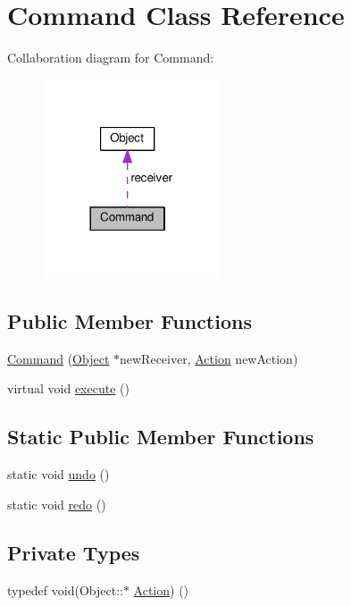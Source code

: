 \hypertarget{classCommand}{}\section{Command Class Reference}
\label{classCommand}


Collaboration diagram for Command\+:
\nopagebreak
\begin{figure}[H]
\begin{center}
\leavevmode
\includegraphics[width=149pt]{classCommand__coll__graph}
\end{center}
\end{figure}
\subsection*{Public Member Functions}
\begin{DoxyCompactItemize}
\item 
\hyperlink{classCommand_ab5004b23122fa06ca3613ee5d082ddc1}{Command} (\hyperlink{classObject}{Object} $\ast$new\+Receiver, \hyperlink{classCommand_a929c81cf8ef71dc52ef78156492f2a42}{Action} new\+Action)
\item 
virtual void \hyperlink{classCommand_a1f73a16e8706aec4c4db746f710b88d9}{execute} ()
\end{DoxyCompactItemize}
\subsection*{Static Public Member Functions}
\begin{DoxyCompactItemize}
\item 
static void \hyperlink{classCommand_a31a6d34a1d61f7cd994075a852714d3c}{undo} ()
\item 
static void \hyperlink{classCommand_ac807fae3326e22c02edc737708f9b288}{redo} ()
\end{DoxyCompactItemize}
\subsection*{Private Types}
\begin{DoxyCompactItemize}
\item 
typedef void(Object\+::$\ast$ \hyperlink{classCommand_a929c81cf8ef71dc52ef78156492f2a42}{Action}) ()
\end{DoxyCompactItemize}
